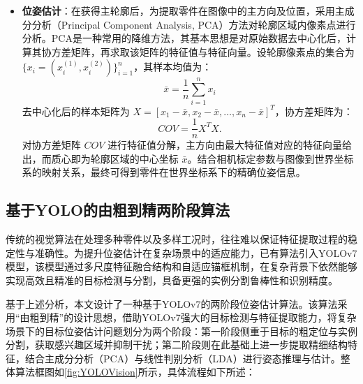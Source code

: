 \documentclass{Diploma}
\begin{document}
\begin{itemize}
  \item \textbf{位姿估计}：在获得主轮廓后，为提取零件在图像中的主方向及位置，采用主成分分析（Principal Component Analysis, PCA）方法\cite{shlens2014tutorial}对轮廓区域内像素点进行分析。PCA是一种常用的降维方法，其基本思想是对原始数据去中心化后，计算其协方差矩阵，再求取该矩阵的特征值与特征向量。设轮廓像素点的集合为 $\{x_i = (x_i^{(1)}, x_i^{(2)})\}_{i=1}^{n}$，其样本均值为：
  \begin{equation}\label{eq:mean}
   \bar{x} = \frac{1}{n} \sum_{i=1}^n x_i
  \end{equation}
  去中心化后的样本矩阵为 $X = [x_1 - \bar{x}, x_2 - \bar{x}, \ldots, x_n - \bar{x}]^T$，协方差矩阵为：
  \begin{equation}\label{eq:cov}
   COV = \frac{1}{n} X^T X.
  \end{equation}
  对协方差矩阵 $COV$ 进行特征值分解，主方向由最大特征值对应的特征向量给出，而质心即为轮廓区域的中心坐标 $\bar{x}$。结合相机标定参数与图像到世界坐标系的映射关系，最终可得到零件在世界坐标系下的精确位姿信息。
\end{itemize}
\subsection{基于YOLO的由粗到精两阶段算法}
传统的视觉算法在处理多种零件以及多样工况时，往往难以保证特征提取过程的稳定性与准确性。为提升位姿估计在复杂场景中的适应能力，已有算法引入YOLOv7模型\cite{wang2023yolov7}，该模型通过多尺度特征融合结构和自适应锚框机制，在复杂背景下依然能够实现高效且精准的目标检测与分割，具备更强的实例分割鲁棒性和识别精度。

基于上述分析，本文设计了一种基于YOLOv7的两阶段位姿估计算法。该算法采用“由粗到精”的设计思想，借助YOLOv7强大的目标检测与特征提取能力，将复杂场景下的目标位姿估计问题划分为两个阶段：第一阶段侧重于目标的粗定位与实例分割，获取感兴趣区域并抑制干扰；第二阶段则在此基础上进一步提取精细结构特征，结合主成分分析（PCA）与线性判别分析（LDA）进行姿态推理与估计\cite{jing2023fpc}。整体算法框图如\ref{fig:YOLOVision}所示，具体流程如下所述：

\end{document}
